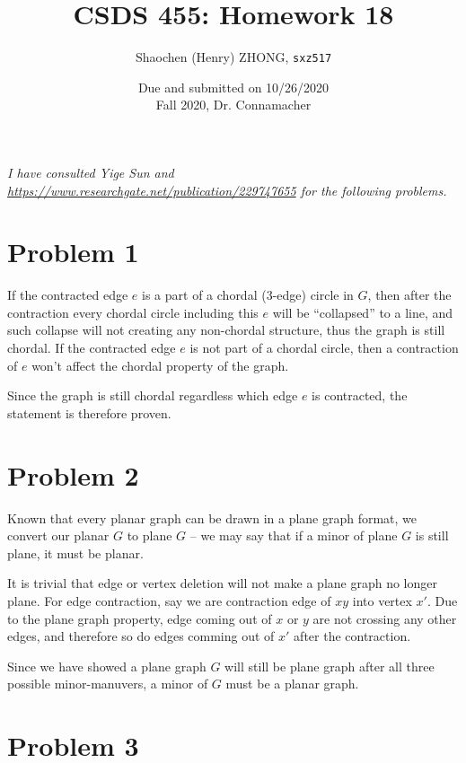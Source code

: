 \documentclass[11pt]{article}
\newcommand{\ilc}{\texttt}
\begin{document}
\title{\textbf{CSDS 455: Homework 18}}

\author{Shaochen (Henry) ZHONG, \ilc{sxz517}}
\date{Due and submitted on 10/26/2020 \\ Fall 2020, Dr. Connamacher}
\maketitle

\textit{I have consulted Yige Sun and \url{https://www.researchgate.net/publication/229747655} for the following problems.}

\section*{Problem 1}

If the contracted edge $e$ is a part of a chordal (3-edge) circle in $G$, then after the contraction every chordal circle including this $e$ will be ``collapsed'' to a line, and such collapse will not creating any non-chordal structure, thus the graph is still chordal. If the contracted edge $e$ is not part of a chordal circle, then a contraction of $e$ won't affect the chordal property of the graph.

Since the graph is still chordal regardless which edge $e$ is contracted, the statement is therefore proven.

\section*{Problem 2}
Known that every planar graph can be drawn in a plane graph format, we convert our planar $G$ to plane $G$ -- we may say that if a minor of plane $G$ is still plane, it must be planar.\newline

It is trivial that edge or vertex deletion will not make a plane graph no longer plane. For edge contraction, say we are contraction edge of $xy$ into vertex $x'$. Due to the plane graph property, edge coming out of $x$ or $y$ are not crossing any other edges, and therefore so do edges comming out of $x'$ after the contraction.

Since we have showed a plane graph $G$ will still be plane graph after all three possible minor-manuvers, a minor of $G$ must be a planar graph.

\section*{Problem 3}
\end{document}
